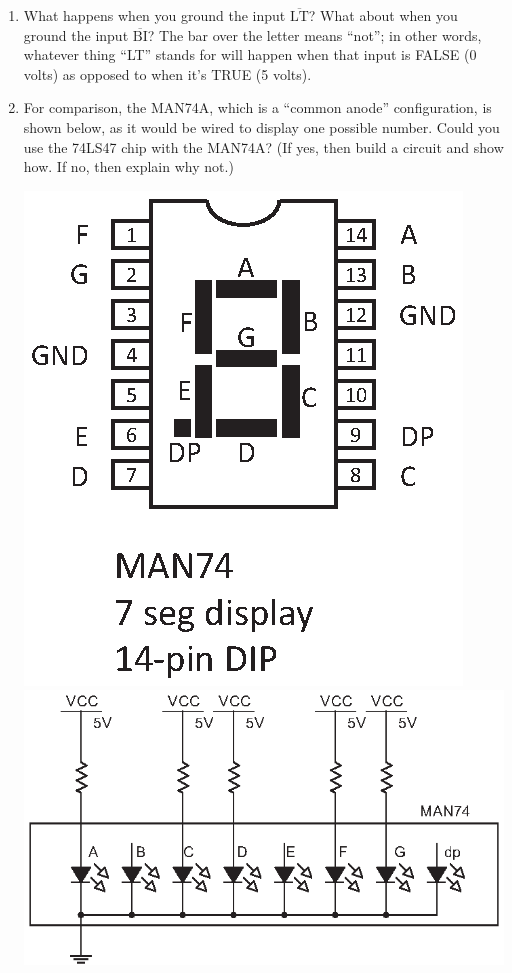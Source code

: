 \begin{enumerate}
\item What happens when you ground the input $\mathrm{\overline{LT}}$?  What about when you ground the input $\mathrm{\overline{BI}}$?  The bar over the letter means ``not''; in other words, whatever thing ``LT'' stands for will happen when that input is FALSE (0 volts) as opposed to when it's TRUE (5 volts).

\item For comparison, the MAN74A, which is a ``common anode'' configuration, is shown below, as it would be wired to display one possible number.  Could you use the 74LS47 chip with the MAN74A?  (If yes, then build a circuit and show how.  If no, then explain why not.)
\begin{center}
\includegraphics[scale=0.8]{appendices/pinouts/man74.eps}
\includegraphics{counters/man74_circuit.eps}
\end{center}


\end{enumerate}
